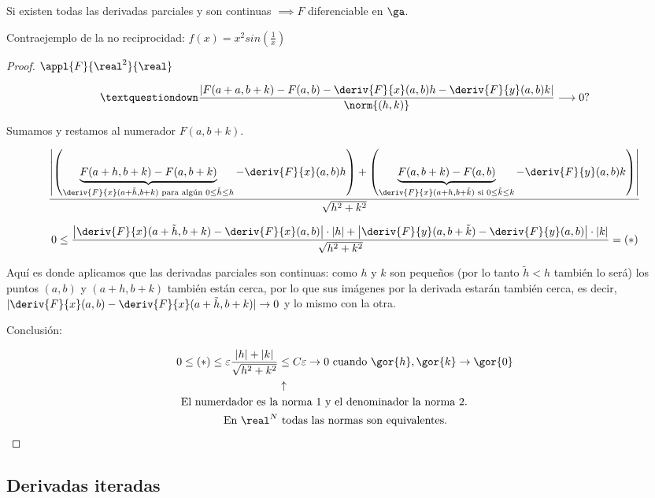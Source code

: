 \begin{theorem}
Si existen todas las derivadas parciales y son continuas $\implies F$ diferenciable en $\ga$.
 
\end{theorem}

Contraejemplo de la no reciprocidad: $f(x) = x^2 sin\left(\frac{1}{x}\right)$

\begin{proof}
 $\appl{F}{\real^2}{\real}$
 
 $$¿\frac{\left|F(a+a,b+k) - F(a,b) - \deriv{F}{x}(a,b) h - \deriv{F}{y}(a,b)k\right|}{\norm{(h,k)}}\longrightarrow 0?$$
 
 Sumamos y restamos al numerador $F(a,b+k)$.
 
 $$\frac{\left|\left(\underbrace{F(a+h,b+k) - F(a,b+k)}_{\deriv{F}{x}(a+\tilde{h},b+k) \text{ para algún } 0 \leq\tilde{h}\leq h} -  \deriv{F}{x}(a,b) h\right) + \left(\underbrace{F(a,b+k) - F(a,b)}_{\deriv{F}{x}(a+h,b+\tilde{k}) \text{ si } 0 \leq\tilde{k}\leq k}- \deriv{F}{y}(a,b) k\right)\right|}{\sqrt{h^2+k^2}}$$

 $$0\leq\frac{\left|\deriv{F}{x}(a+\tilde{h},b+k)-\deriv{F}{x}(a,b)\right| \cdot |h| + \left| \deriv{F}{y}(a,b+\tilde{k}) - \deriv{F}{y}(a,b)\right| \cdot |k|}{\sqrt{h^2+k^2}} = (*)$$
 
 Aquí es donde aplicamos que las derivadas parciales son continuas: como $h$ y $k$ son pequeños (por lo tanto $\tilde{h}<h$ también lo será) los puntos $(a,b)$ y $(a+h,b+k)$ también están cerca, por lo que sus imágenes por la derivada estarán también cerca, es decir, $|\deriv{F}{x}(a,b)-\deriv{F}{x}(a+\tilde{h},b+k)| \rightarrow 0$ y lo mismo con la otra.
 
 Conclusión:
 
 \begin{align*}
0 \leq (*) \leq \varepsilon \frac{|h|+|k|}{\sqrt{h^2+k^2}} &\leq C\varepsilon \rightarrow 0 \text{ cuando } \gor{h},\gor{k} \rightarrow \gor{0}\\
&\uparrow\\
\text{El numerdador es la} & \text{ norma 1 y el denominador la norma 2.}\\
\text{En } \real^N &\text{ todas las normas son equivalentes.}  
 \end{align*}
 
 
\end{proof}


\subsection{Derivadas iteradas}

